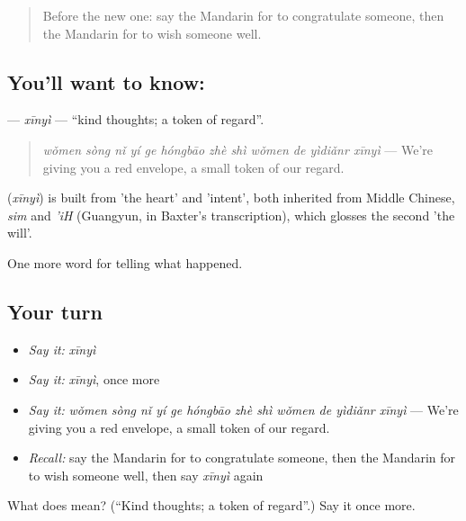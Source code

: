 \label{lesson:ZH-C337-xinyi}



\begin{quote}
Before the new one: say the Mandarin for to congratulate someone, then the Mandarin for to wish someone well.
\end{quote}

\subsection*{You'll want to know: }
\textbf{} — \emph{xīnyì} — \textquotedblleft{}kind thoughts; a token of regard\textquotedblright{}.

\begin{quote}
\textbf{} \emph{wǒmen sòng nǐ yí ge hóngbāo zhè shì wǒmen de yìdiǎnr xīnyì} — We're giving you a red envelope, a small token of our regard.
\end{quote}

\begin{cousinweb}
\textbf{} (\emph{xīnyì}) is built from  'the heart' and  'intent', both inherited from Middle Chinese, \emph{sim} and \emph{'iH} (Guangyun, in Baxter's transcription), which glosses the second 'the will'.
\end{cousinweb}

\begin{grammarlens}[title={What you've built}]
One more word for telling what happened.
\end{grammarlens}

\subsection*{Your turn}
\begin{itemize}
\raggedright
  \item \emph{Say it:} \emph{xīnyì}
  \item \emph{Say it:} \emph{xīnyì}, once more
  \item \emph{Say it:} \emph{wǒmen sòng nǐ yí ge hóngbāo zhè shì wǒmen de yìdiǎnr xīnyì} — We're giving you a red envelope, a small token of our regard.
  \item \emph{Recall:} say the Mandarin for to congratulate someone, then the Mandarin for to wish someone well, then say \emph{xīnyì} again
\end{itemize}

\begin{tcolorbox}[breakable,colback=teal!4,colframe=teal!35!black,title={Before you move on}]
What does  mean? (\textquotedblleft{}Kind thoughts; a token of regard\textquotedblright{}.) Say it once more.
\end{tcolorbox}
